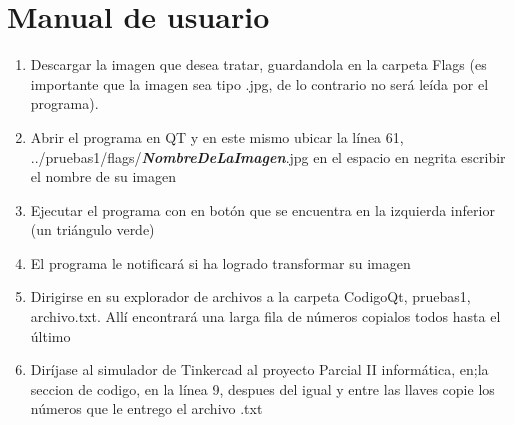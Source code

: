 \documentclass{article}
\begin{document}
\section{Manual de usuario} \label{contenido}
\begin{enumerate}
\item Descargar la imagen que desea tratar, guardandola en la carpeta Flags (es importante que la imagen sea tipo .jpg, de lo contrario no será leída por el programa).
\item Abrir el programa en QT y en este mismo ubicar la línea 61, ../pruebas1/flags/\textit{\textbf{NombreDeLaImagen}}.jpg en el espacio en negrita escribir el nombre de su imagen 
\item Ejecutar el programa con en botón que se encuentra en la izquierda inferior (un triángulo verde)
\item El programa le notificará si ha logrado transformar su imagen
\item Dirigirse en su explorador de archivos a la carpeta CodigoQt, pruebas1, archivo.txt. Allí encontrará una larga fila de números copialos todos hasta el último
\item Diríjase al simulador de Tinkercad al proyecto Parcial II informática, en;la seccion de codigo, en la línea 9, despues del igual y entre las llaves copie los números que le entrego el archivo .txt 
\end{enumerate}
\end{document}
